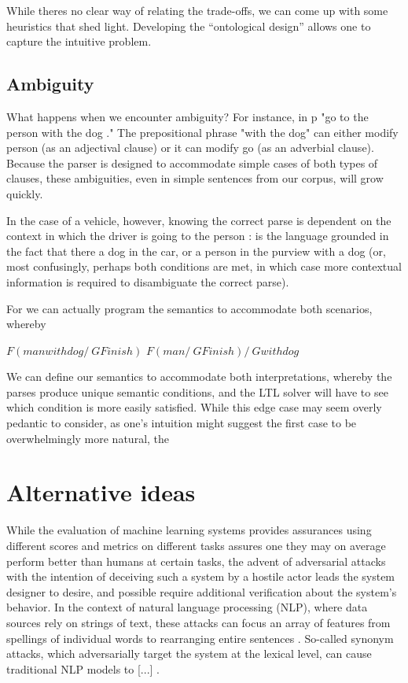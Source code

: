 \documentclass[a4paper, 11pt]{article}
\begin{document}
While theres no clear way of relating the trade-offs, we can come up with some
heuristics that shed light. Developing the ``ontological design'' allows one to
capture the intuitive problem.


\subsection{Ambiguity}

What happens when we encounter ambiguity? For instance, in p "go to the person
with the dog ." The prepositional phrase "with the dog" can either modify person
(as an adjectival clause) or it can modify go (as an adverbial clause). Because
the parser is designed to accommodate simple cases of both types of clauses,
these ambiguities, even in simple sentences from our corpus, will grow quickly. 

In the case of a vehicle, however, knowing the correct parse is dependent on
the context in which the driver is going to the person : is the language
grounded in the fact that there a dog in the car, or a person in the purview
with a dog (or, most confusingly, perhaps both conditions are met, in which case
more contextual information is required to disambiguate the correct parse).

For we can actually program the semantics to accommodate both scenarios, whereby

$F (manwithdog /\ G Finish)$
$F (man /\ G Finish) /\ G withdog$

We can define our semantics to accommodate both interpretations, whereby the
parses produce unique semantic conditions, and the LTL solver will have to see
which condition is more easily satisfied. While this edge case may seem overly
pedantic to consider, as one's intuition might suggest the first case to be
overwhelmingly more natural, the


\section{Alternative ideas}

While the evaluation of machine learning systems provides assurances using
different scores and metrics on different tasks assures one they may on average
perform better than humans at certain tasks, the advent of adversarial attacks
\cite{szegedy} with the intention of deceiving such a system by a hostile actor
leads the system designer to desire, and possible require additional
verification about the system's behavior. In the context of natural language
processing (NLP), where data sources rely on strings of text, these attacks can
focus an array of features from spellings of individual words to rearranging
entire sentences \cite{}. So-called synonym attacks, which adversarially target
the system at the lexical level, can cause traditional NLP models to [...]
\cite{}.
\end{document}
